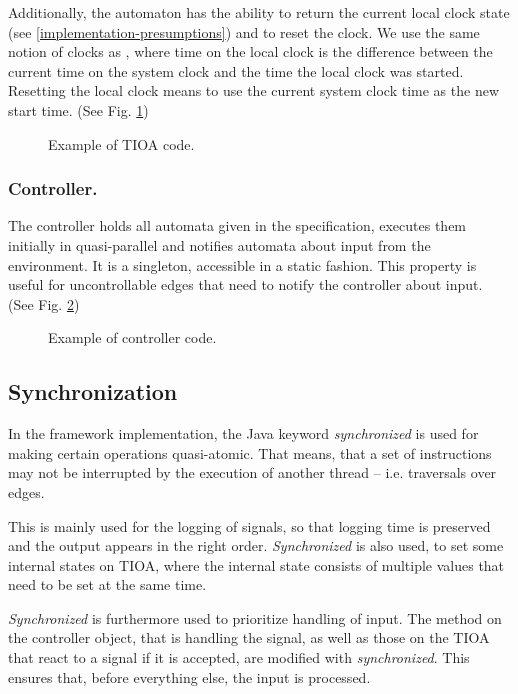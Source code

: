Additionally, the automaton has the ability to return the current
local clock state (see \ref{implementation-presumptions}) and to
reset the clock. We use the same notion of clocks as \cite{amnell_code_2002},
where time on the local clock is the difference between the current
time on the system clock and the time the local clock was started.
Resetting the local clock means to use the current system clock time
as the new start time. (See Fig. \ref{tioa-example})

\begin{figure}[t]

\caption{Example of TIOA code. \label{tioa-example}}
\end{figure}


\subsubsection{Controller.}

The controller holds all automata given in the specification, executes
them initially in quasi-parallel and notifies automata about input
from the environment. It is a singleton, accessible in a static fashion.
This property is useful for uncontrollable edges that need to notify
the controller about input. (See Fig. \ref{controller-example})

\begin{figure}[t]

\caption{Example of controller code. \label{controller-example}}
\end{figure}


\subsection{Synchronization}

In the framework implementation, the Java keyword \textit{synchronized} is 
used for making certain operations quasi-atomic. That means, that a set of
instructions may not be interrupted by the execution of another thread -- 
i.e. traversals over edges.

This is mainly used for the logging of signals, so that logging time
is preserved and the output appears in the right order. \textit{Synchronized}
is also used, to set some internal states on TIOA, where the internal state
consists of multiple values that need to be set at the same time.

\textit{Synchronized} is furthermore used to prioritize handling of input.
The method on the controller object, that is handling the signal, as well as
those on the TIOA that react to a signal if it is accepted, are modified with
\textit{synchronized}. This ensures that, before everything else, the input
is processed.


